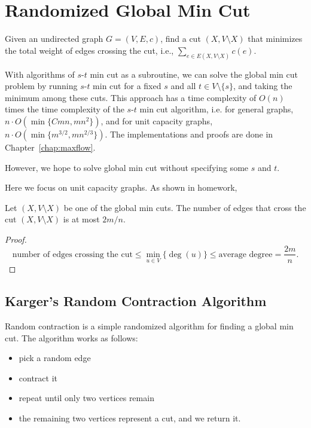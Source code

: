 \chapter{Randomized Global Min Cut}

\begin{problem}
Given an undirected graph $G = (V,E,c)$, find a cut $(X, V\setminus X)$ that minimizes the total weight of edges crossing the cut, i.e., $\sum_{e \in E(X, V\setminus X)} c(e)$.
\end{problem}

With algorithms of $s$-$t$ min cut as a subroutine, we can solve the global min cut problem by running $s$-$t$ min cut for a fixed $s$ and all $t \in V\setminus \{s\}$, and taking the minimum among these cuts. This approach has a time complexity of $O(n)$ times the time complexity of the $s$-$t$ min cut algorithm, i.e. for general graphs, $n\cdot O(\min\{Cmn, mn^2\})$, and for unit capacity graphs, $n\cdot O(\min\{m^{3/2}, mn^{2/3}\})$. The implementations and proofs are done in Chapter~\ref{chap:maxflow}.

However, we hope to solve global min cut without specifying some $s$ and $t$.

Here we focus on unit capacity graphs.
As shown in homework,
\begin{lemma}
	Let $(X, V\setminus X)$ be one of the global min cuts.
	The number of edges that cross the cut $(X, V\setminus X)$ is at most $2m/n$.
\end{lemma}
\begin{proof}
	\[
		\text{number of edges crossing the cut} \leq \min_{u\in V}\{\deg(u)\}
		\leq \text{average degree} = \frac{2m}{n}.
	\]
\end{proof}

\section{Karger's Random Contraction Algorithm}

Random contraction is a simple randomized algorithm for finding a global min cut. The algorithm works as follows:
\begin{itemize}
	\item pick a random edge
	\item contract it
	\item repeat until only two vertices remain
	\item the remaining two vertices represent a cut, and we return it.
\end{itemize}

